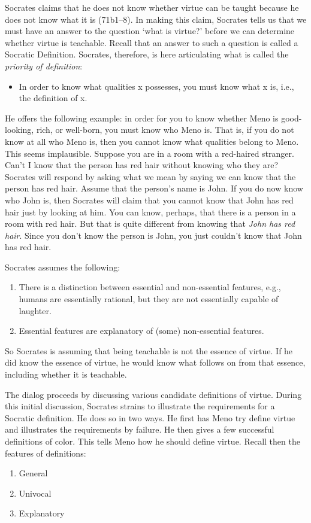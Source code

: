 \documentclass[10 pt]{article}
\begin{document}
Socrates claims that he does not know whether virtue can be taught because he does not know what it is (71b1--8). In making this claim, Socrates tells us that we must have an answer to the question `what is virtue?' before we can determine whether virtue is teachable. Recall that an answer to such a question is called a Socratic Definition. Socrates, therefore, is here articulating what is called the \emph{priority of definition}:
\begin{itemize}
\item In order to know what qualities x possesses, you must know what x is, i.e., the definition of x. 
\end{itemize}
He offers the following example: in order for you to know whether Meno is good-looking, rich, or well-born, you must know who Meno is. That is, if you do not know at all who Meno is, then you cannot know what qualities belong to Meno. This seems implausible. Suppose you are in a room with a red-haired stranger. Can't I know that the person has red hair without knowing who they are? Socrates will respond by asking what we mean by saying we can know that the person has red hair. Assume that the person's name is John. If you do now know who John is, then Socrates will claim that you cannot know that John has red hair just by looking at him. You can know, perhaps, that there is a person in a room with red hair. But that is quite different from knowing that \emph{John has red hair}. Since you don't know the person is John, you just couldn't know that John has red hair. 

Socrates assumes the following:
\begin{enumerate}
\item There is a distinction between essential and non-essential features, e.g., humans are essentially rational, but they are not essentially capable of laughter.
\item Essential features are explanatory of (some) non-essential features.
\end{enumerate}
So Socrates is assuming that being teachable is not the essence of virtue. If he did know the essence of virtue, he would know what follows on from that essence, including whether it is teachable. 

The dialog proceeds by discussing  various candidate definitions of virtue. During this initial discussion, Socrates strains to illustrate the requirements for a Socratic definition. He does so in two ways. He first has Meno try define virtue and illustrates the requirements by failure. He then gives a few successful definitions of color. This tells Meno how he should define virtue. Recall then the features of definitions: 
\begin{enumerate}
\item General
\item Univocal
\item Explanatory 
\end{enumerate}
\end{document}
